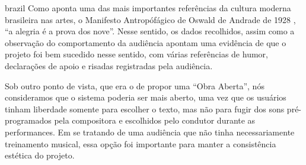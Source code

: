 \begin{otherlanguage*}{brazil}
Como aponta uma das mais importantes referências da cultura moderna brasileira nas artes, o Manifesto Antropófágico de Oswald de Andrade de 1928 \cite{Andrade1928}, ``a alegria é a prova dos nove''. Nesse sentido, os dados recolhidos, assim como a observação do comportamento da audiência apontam uma evidência de que o projeto foi bem sucedido nesse sentido, com várias referências de humor, declarações de apoio e risadas registradas pela audiência. 


Sob outro ponto de vista, que era o de propor uma ``Obra Aberta'', nós consideramos que o sistema poderia ser mais aberto, uma vez que os usuários tinham liberdade somente para escolher o texto, mas não para fugir dos sons pré-programados pela compositora e escolhidos pelo condutor durante as performances. Em se tratando de uma audiência que não tinha necessariamente treinamento musical, essa opção foi importante para manter a consistência estética do projeto.







\end{otherlanguage*}
